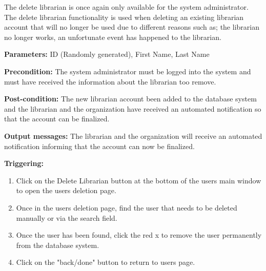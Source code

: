 The delete librarian is once again only available for the system administrator. The delete librarian functionality is used when deleting an existing librarian account that will no longer be used due to different reasons such as; the librarian no longer works, an unfortunate event has happened to the librarian.

\begin{description}

\item \textbf{Parameters:} ID (Randomly generated), First Name, Last Name

\item \textbf{Precondition:} The system administrator must be logged into the system and must have received the information about the librarian too remove. 

\item \textbf{Post-condition:} The new librarian account been added to the database system and the librarian and the organization have received an automated notification so that the account can be finalized. 

\item \textbf{Output messages:} The librarian and the organization will receive an automated notification informing that the account can now be finalized. 

\item \textbf{Triggering:}
\begin{enumerate}

\item Click on the Delete Librarian button at the bottom of the users main window to open the users deletion page.

\item Once in the users deletion page, find the user that needs to be deleted manually or via the search field.

\item Once the user has been found, click the red x to remove the user permanently from the database system. 

\item Click on the "back/done" button to return to users page.

\end{enumerate}

\end{description}